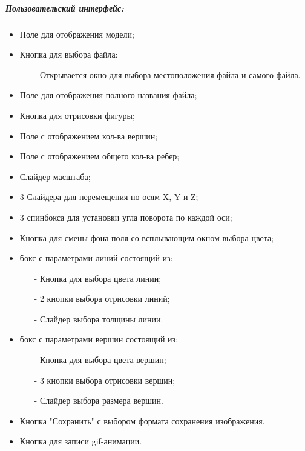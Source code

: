 \documentclass[a4paper,20pt]{article}
\begin{document}
	\subparagraph{Пользовательский интерфейс:}
	\begin{itemize}
		\item Поле для отображения модели;
		\item Кнопка для выбора файла:
		\begin{itemize}
			\item[-] Открывается окно для выбора местоположения файла и самого файла.
		\end{itemize}
		\item Поле для отображения полного названия файла;
		\item Кнопка для отрисовки фигуры;
		\item Поле с отображением кол-ва вершин;
		\item Поле с отображением общего кол-ва ребер;
		\item Слайдер масштаба;
		\item 3 Слайдера для перемещения по осям X, Y и Z;
		\item 3 спинбокса для установки угла поворота по каждой оси;
		\item Кнопка для смены фона поля со всплывающим окном выбора цвета;
		\item бокс с параметрами линий состоящий из:
		\begin{itemize}
			\item[-] Кнопка для выбора цвета линии;
			\item[-] 2 кнопки выбора отрисовки линий;
			\item[-] Слайдер выбора толщины линии.
		\end{itemize}
		\item бокс с параметрами вершин состоящий из:
		\begin{itemize}
			\item[-] Кнопка для выбора цвета вершин;
			\item[-] 3 кнопки выбора отрисовки вершин;
			\item[-] Слайдер выбора размера вершин.
		\end{itemize}
		\item Кнопка "Сохранить" с выбором формата сохранения изображения.
		\item Кнопка для записи gif-анимации.
		
	\end{itemize}
	
\end{document}
